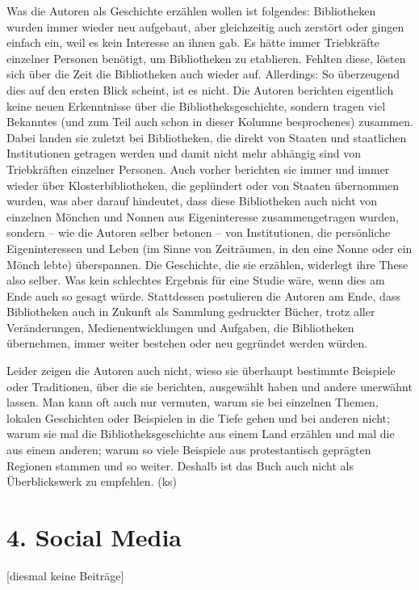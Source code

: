 \documentclass[a4paper,
fontsize=11pt,
oneside,
numbers=noperiodatend,
parskip=half-,
bibliography=totoc,
final
]{scrartcl}
\begin{document}
Was die Autoren als Geschichte erzählen wollen ist folgendes:
Bibliotheken wurden immer wieder neu aufgebaut, aber gleichzeitig auch
zerstört oder gingen einfach ein, weil es kein Interesse an ihnen gab.
Es hätte immer Triebkräfte einzelner Personen benötigt, um Bibliotheken
zu etablieren. Fehlten diese, lösten sich über die Zeit die Bibliotheken
auch wieder auf. Allerdings: So überzeugend dies auf den ersten Blick
scheint, ist es nicht. Die Autoren berichten eigentlich keine neuen
Erkenntnisse über die Bibliotheksgeschichte, sondern tragen viel
Bekanntes (und zum Teil auch schon in dieser Kolumne besprochenes)
zusammen. Dabei landen sie zuletzt bei Bibliotheken, die direkt von
Staaten und staatlichen Institutionen getragen werden und damit nicht
mehr abhängig sind von Triebkräften einzelner Personen. Auch vorher
berichten sie immer und immer wieder über Klosterbibliotheken, die
geplündert oder von Staaten übernommen wurden, was aber darauf
hindeutet, dass diese Bibliotheken auch nicht von einzelnen Mönchen und
Nonnen aus Eigeninteresse zusammengetragen wurden, sondern -- wie die
Autoren selber betonen -- von Institutionen, die persönliche
Eigeninteressen und Leben (im Sinne von Zeiträumen, in den eine Nonne
oder ein Mönch lebte) überspannen. Die Geschichte, die sie erzählen,
widerlegt ihre These also selber. Was kein schlechtes Ergebnis für eine
Studie wäre, wenn dies am Ende auch so gesagt würde. Stattdessen
postulieren die Autoren am Ende, dass Bibliotheken auch in Zukunft als
Sammlung gedruckter Bücher, trotz aller Veränderungen,
Medienentwicklungen und Aufgaben, die Bibliotheken übernehmen, immer
weiter bestehen oder neu gegründet werden würden.

Leider zeigen die Autoren auch nicht, wieso sie überhaupt bestimmte
Beispiele oder Traditionen, über die sie berichten, ausgewählt haben und
andere unerwähnt lassen. Man kann oft auch nur vermuten, warum sie bei
einzelnen Themen, lokalen Geschichten oder Beispielen in die Tiefe gehen
und bei anderen nicht; warum sie mal die Bibliotheksgeschichte aus einem
Land erzählen und mal die aus einem anderen; warum so viele Beispiele
aus protestantisch geprägten Regionen stammen und so weiter. Deshalb ist
das Buch auch nicht als Überblickswerk zu empfehlen. (ks)

\hypertarget{social-media}{%
\section{4. Social Media}\label{social-media}}

{[}diesmal keine Beiträge{]}
\end{document}
